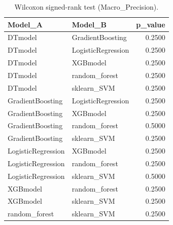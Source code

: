 \begin{table}[t]
\centering
\begin{tabular}{llr}
\toprule
Model_A & Model_B & p_value \\
\midrule
DTmodel & GradientBoosting & 0.2500 \\
DTmodel & LogisticRegression & 0.2500 \\
DTmodel & XGBmodel & 0.2500 \\
DTmodel & random_forest & 0.2500 \\
DTmodel & sklearn_SVM & 0.2500 \\
GradientBoosting & LogisticRegression & 0.2500 \\
GradientBoosting & XGBmodel & 0.2500 \\
GradientBoosting & random_forest & 0.5000 \\
GradientBoosting & sklearn_SVM & 0.2500 \\
LogisticRegression & XGBmodel & 0.2500 \\
LogisticRegression & random_forest & 0.2500 \\
LogisticRegression & sklearn_SVM & 0.5000 \\
XGBmodel & random_forest & 0.2500 \\
XGBmodel & sklearn_SVM & 0.2500 \\
random_forest & sklearn_SVM & 0.2500 \\
\bottomrule
\end{tabular}
\caption{Wilcoxon signed-rank test (Macro_Precision).}
\label{tab:wilcoxon_Macro_Precision}
\end{table}